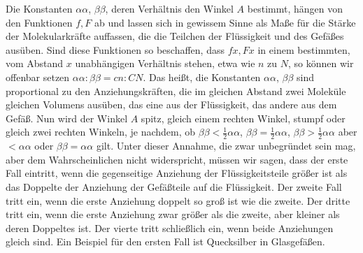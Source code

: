 Die Konstanten $\alpha\alpha$, $\beta\beta$, deren Verhältnis den Winkel $A$ bestimmt, hängen von den Funktionen $f,F$ ab und lassen sich in gewissem Sinne als Maße für die Stärke der Molekularkräfte auffassen, die die Teilchen der Flüssigkeit und des Gefäßes ausüben. Sind diese Funktionen so beschaffen, dass $fx,Fx$ in einem bestimmten, vom Abstand $x$ unabhängigen Verhältnis stehen, etwa wie $n$ zu $N$, so können wir offenbar setzen
$\alpha\alpha:\beta\beta=cn:CN$. Das heißt, die Konstanten $\alpha\alpha$, $\beta\beta$ sind proportional zu den Anziehungskräften, die im gleichen Abstand zwei Moleküle gleichen Volumens ausüben, das eine aus der Flüssigkeit, das andere aus dem Gefäß. Nun wird der Winkel $A$ spitz, gleich einem rechten Winkel, stumpf oder gleich zwei rechten Winkeln, je nachdem, ob $\beta\beta<\frac12\alpha\alpha$, $\beta\beta=\frac12\alpha\alpha$, $\beta\beta>\frac12\alpha\alpha$ aber $<\alpha\alpha$ oder $\beta\beta=\alpha\alpha$ gilt. Unter dieser Annahme, die zwar unbegründet sein mag, aber dem Wahrscheinlichen nicht widerspricht, müssen wir sagen, dass der erste Fall eintritt, wenn die gegenseitige Anziehung der Flüssigkeitsteile größer ist als das Doppelte der Anziehung der Gefäßteile auf die Flüssigkeit. Der zweite Fall tritt ein, wenn die erste Anziehung doppelt so groß ist wie die zweite. Der dritte tritt ein, wenn die erste Anziehung zwar größer als die zweite, aber kleiner als deren Doppeltes ist. Der vierte tritt schließlich ein, wenn beide Anziehungen gleich sind. Ein Beispiel für den ersten Fall ist Quecksilber in Glasgefäßen.

